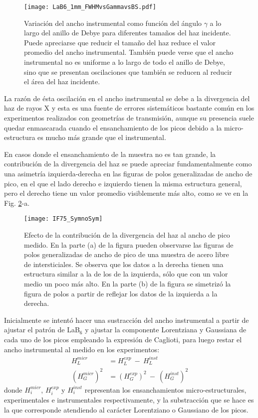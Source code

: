 \begin{figure}[!htb]
  \centering
  \texttt{[image: LaB6\_1mm\_FWHMvsGammavsBS.pdf]}
  \caption{Variación del ancho instrumental como función del ángulo $\gamma$ a lo largo del anillo de Debye para diferentes tamaños del haz incidente. Puede apreciarse que reducir el tamaño del haz reduce el valor promedio del ancho instrumental. También puede verse que el ancho instrumental no es uniforme a lo largo de todo el anillo de Debye, sino que se presentan oscilaciones que también se reducen al reducir el área del haz incidente.}
  \label{fig:LaB6vsGamma}
\end{figure}

La razón de ésta oscilación en el ancho instrumental se debe a la divergencia del haz de rayos X\cite{Wcislak2002} y esta es una fuente de errores sistemáticos bastante común en los experimentos realizados con geometrías de transmisión, aunque su presencia suele quedar enmascarada cuando el ensanchamiento de los picos debido a la micro-estructura es mucho más grande que el instrumental.

En casos donde el ensanchamiento de la muestra no es tan grande, la contribución de la divergencia del haz se puede apreciar fundamentalmente como una asimetría izquierda-derecha en las figuras de polos generalizadas de ancho de pico, en el que el lado derecho e izquierdo tienen la misma estructura general, pero el derecho tiene un valor promedio visiblemente más alto, como se ve en la Fig. \ref{fig:IF75NoSym}-a.

\begin{figure}[!htb] 
  \centering
  \texttt{[image: IF75\_SymnoSym]}
  \caption{Efecto de la contribución de la divergencia del haz al ancho de pico medido. En la parte (a) de la figura pueden observarse las figuras de polos generalizadas de ancho de pico de una muestra de acero libre de intersticiales. Se observa que los datos a la derecha tienen una estructura similar a la de los de la izquierda, sólo que con un valor medio un poco más alto. En la parte (b) de la figura se simetrizó la figura de polos a partir de reflejar los datos de la izquierda a la derecha.}
  \label{fig:IF75NoSym}
\end{figure}

Inicialmente se intentó hacer una sustracción del ancho instrumental a partir de ajustar el patrón de LaB$_6$ y ajustar la componente Lorentziana y Gaussiana de cada uno de los picos empleando la expresión de Caglioti\cite{Caglioti1958}, para luego restar el ancho instrumental al medido en los experimentos:
\begin{align}
  H_L^{micr} & = H_L^{exp} \ - \ H_L^{inst} \nonumber \\
  (H_G^{micr})^2 & = (H_G^{exp})^2 \ - \ (H_G^{inst})^2 
  \label{eq:instrumental}
\end{align}
\noindent
donde $H_i^{micr}$, $H_i^{exp}$ y $H_i^{inst}$ representan los ensanchamientos micro-estructurales, experimentales e instrumentales respectivamente, y la substracción que se hace es la que corresponde atendiendo al carácter Lorentziano o Gaussiano de los picos.

